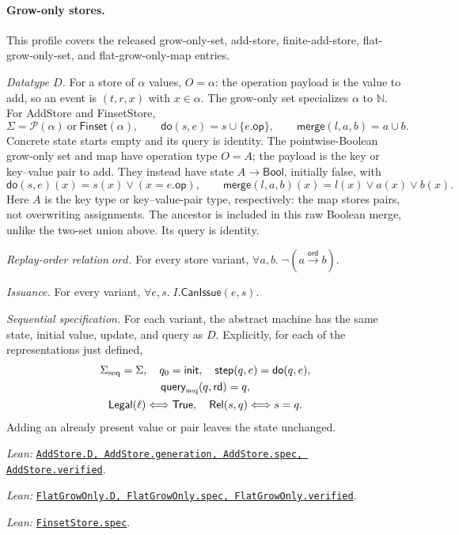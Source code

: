 \documentclass[11pt]{article}
\theoremstyle{definition}
\newcommand{\N}{\mathbb N}
\newcommand{\Pow}{\mathcal P}
\newcommand{\State}{\Sigma}
\newcommand{\doop}{\mathsf{do}}
\newcommand{\merge}{\mathsf{merge}}
\newcommand{\ord}{\mathrel{\xrightarrow{\mathsf{ord}}}}
\newcommand{\src}[2]{\href{../../#1}{\texttt{#2}}}
\newcommand{\anchor}[2]{\par\smallskip\noindent\emph{Lean: }\src{#1}{#2}.}
\begin{document}
\paragraph{Grow-only stores.}
This profile covers the released grow-only-set, add-store,
finite-add-store, flat-grow-only-set, and flat-grow-only-map entries.

\emph{Datatype $D$.} For a store of $\alpha$ values, $O=\alpha$: the operation payload is the value
to add, so an event is $(t,r,x)$ with $x\in\alpha$. The grow-only set
specializes $\alpha$ to $\N$.
For AddStore and FinsetStore,
\[
 \State=\Pow(\alpha)\ \text{or}\ \mathsf{Finset}(\alpha),\qquad
 \doop(s,e)=s\cup\{e.\mathsf{op}\},\qquad
 \merge(l,a,b)=a\cup b.
\]
Concrete state starts empty and its query is identity.
The pointwise-Boolean grow-only set and map have operation type $O=A$;
the payload is the key or key--value pair to add. They instead have state
$A\to\mathsf{Bool}$, initially false, with
\[
 \doop(s,e)(x)=s(x)\lor(x=e.\mathsf{op}),\qquad
 \merge(l,a,b)(x)=l(x)\lor a(x)\lor b(x).
\]
Here $A$ is the key type or key--value-pair type, respectively: the map stores
pairs, not overwriting assignments. The ancestor is included in this raw
Boolean merge, unlike the two-set union above. Its query is identity.

\emph{Replay-order relation $ord$.} For every store variant, $\forall a,b.\;\neg(a\ord b)$.

\emph{Issuance.} For every variant, $\forall e,s.\;I.\mathsf{CanIssue}(e,s)$.

\emph{Sequential specification.} For each variant, the abstract machine has the
same state, initial value, update, and query as $D$. Explicitly, for each
of the representations just defined,
\[
\begin{gathered}
 \Sigma_{\rm seq}=\State,\quad q_0=\mathsf{init},\quad
 \mathsf{step}(q,e)=\doop(q,e),\\
 \mathsf{query}_{\rm seq}(q,\mathsf{rd})=q,\\
 \mathsf{Legal}(\ell)\Longleftrightarrow\mathsf{True},\quad
 \mathsf{Rel}(s,q)\Longleftrightarrow s=q.
\end{gathered}
\]
Adding an already present value or pair leaves the state unchanged.
\anchor{Sal/MRDTs/Instances/AddStore.lean}
  {AddStore.D, AddStore.generation, AddStore.spec, AddStore.verified}
\anchor{Sal/MRDTs/Instances/FlatGrowOnly.lean}
  {FlatGrowOnly.D, FlatGrowOnly.spec, FlatGrowOnly.verified}
\anchor{Sal/MRDTs/Instances/FinsetStore.lean}{FinsetStore.spec}
\end{document}
